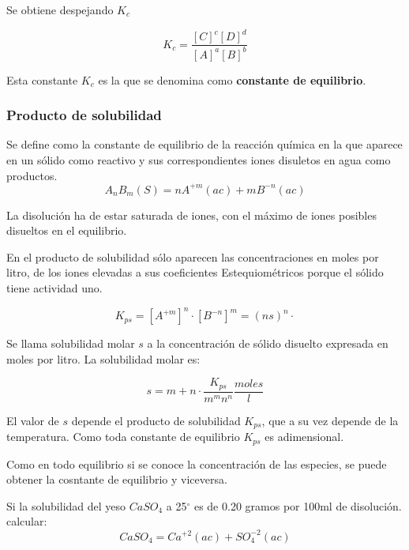 Se obtiene despejando $K_c$

\begin{equation}
	K_c=\frac{[C]^c[D]^d}{[A]^a[B]^b}
\end{equation}

Esta constante $K_c$ es la que se denomina como \textbf{constante de equilibrio}.

\subsubsection{Producto de solubilidad}

\begin{definition}
	Se define como la constante de equilibrio de la reacción química en la que
	aparece en un sólido como reactivo y sus correspondientes iones disuletos en agua como productos.
	\begin{equation}
		A_nB_m(S)=nA^{+m}(ac)+mB^{-n}(ac)
	\end{equation}
\end{definition}

La disolución ha de estar saturada de iones, con el máximo de iones posibles disueltos en el equilibrio.

En el producto de solubilidad sólo aparecen las concentraciones en moles por litro, de los iones elevadas a sus coeficientes
Estequiométricos porque el sólido tiene actividad uno.

\begin{equation}
	K_{ps}=[A^{+m}]^n\cdot [B^{-n}]^m=(ns)^n \cdot
\end{equation}

Se llama solubilidad molar $s$ a la concentración de sólido disuelto expresada en moles por litro.
La solubilidad molar es:

\begin{equation}
	s=m+n \cdot \frac{K_{ps}}{m^mn^n} \frac{moles}{l}
\end{equation}

El valor de $s$ depende el producto de solubilidad $K_{ps}$, que a su vez depende de la temperatura.
Como toda constante de equilibrio $K_{ps}$ es adimensional.

Como en todo equilibrio si se conoce la concentración de las especies, se puede obtener la cosntante de equilibrio y viceversa.

\begin{example}
	Si la solubilidad del yeso $CaSO_4$ a 25$^{\circ}$ es de 0.20 gramos por 100ml de disolución. calcular:
	\begin{equation*}
		CaSO_4=Ca^{+2}(ac)+SO_4^{-2}(ac)
	\end{equation*}
\end{example}

